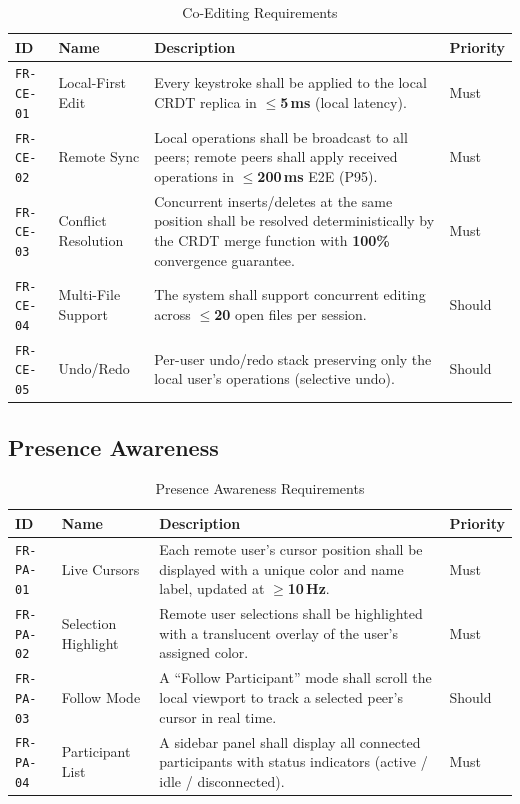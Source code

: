 \documentclass[12pt, a4paper, oneside]{article}
\newcommand{\reqid}[1]{\texttt{\textcolor{primaryblue}{#1}}}
\newcommand{\metric}[1]{\textbf{\textcolor{accentgreen}{#1}}}
\begin{document}
\begin{table}[H]
\centering
\caption{Co-Editing Requirements}
\begin{tabularx}{\textwidth}{l l X l}
\toprule
\textbf{ID} & \textbf{Name} & \textbf{Description} & \textbf{Priority} \\
\midrule
\reqid{FR-CE-01} & Local-First Edit & Every keystroke shall be applied to the local CRDT replica in \metric{$\leq$5\,ms} (local latency). & Must \\
\reqid{FR-CE-02} & Remote Sync & Local operations shall be broadcast to all peers; remote peers shall apply received operations in \metric{$\leq$200\,ms} E2E (P95). & Must \\
\reqid{FR-CE-03} & Conflict Resolution & Concurrent inserts/deletes at the same position shall be resolved deterministically by the CRDT merge function with \metric{100\%} convergence guarantee. & Must \\
\reqid{FR-CE-04} & Multi-File Support & The system shall support concurrent editing across \metric{$\leq$20} open files per session. & Should \\
\reqid{FR-CE-05} & Undo/Redo & Per-user undo/redo stack preserving only the local user's operations (selective undo). & Should \\
\bottomrule
\end{tabularx}
\end{table}

\subsection{Presence Awareness}

\begin{table}[H]
\centering
\caption{Presence Awareness Requirements}
\begin{tabularx}{\textwidth}{l l X l}
\toprule
\textbf{ID} & \textbf{Name} & \textbf{Description} & \textbf{Priority} \\
\midrule
\reqid{FR-PA-01} & Live Cursors & Each remote user's cursor position shall be displayed with a unique color and name label, updated at \metric{$\geq$10\,Hz}. & Must \\
\reqid{FR-PA-02} & Selection Highlight & Remote user selections shall be highlighted with a translucent overlay of the user's assigned color. & Must \\
\reqid{FR-PA-03} & Follow Mode & A ``Follow Participant'' mode shall scroll the local viewport to track a selected peer's cursor in real time. & Should \\
\reqid{FR-PA-04} & Participant List & A sidebar panel shall display all connected participants with status indicators (active / idle / disconnected). & Must \\
\bottomrule
\end{tabularx}
\end{table}
\end{document}
